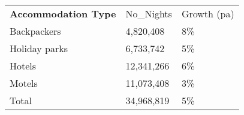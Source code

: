 \begin{tabular}[t]{p{5cm}p{1.3cm}p{1.2cm}}
 \textbf{Accommodation Type} & No\_Nights & Growth (pa) \\ 
 Backpackers &  4,820,408 & 8\% \\ 
  Holiday parks &  6,733,742 & 5\% \\ 
  Hotels & 12,341,266 & 6\% \\ 
  Motels & 11,073,408 & 3\% \\ 
  Total & 34,968,819 & 5\% \\ 
  \end{tabular}
